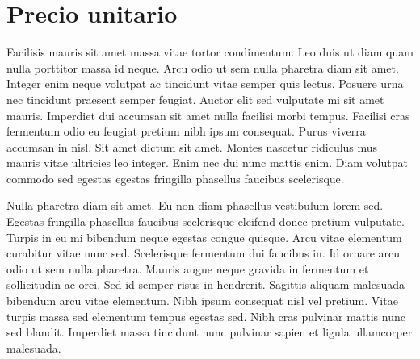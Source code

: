 \section{Precio unitario}

Facilisis mauris sit amet massa vitae tortor condimentum. Leo duis ut diam quam nulla porttitor massa id neque. Arcu odio ut sem nulla pharetra diam sit amet. Integer enim neque volutpat ac tincidunt vitae semper quis lectus. Posuere urna nec tincidunt praesent semper feugiat. Auctor elit sed vulputate mi sit amet mauris. Imperdiet dui accumsan sit amet nulla facilisi morbi tempus. Facilisi cras fermentum odio eu feugiat pretium nibh ipsum consequat. Purus viverra accumsan in nisl. Sit amet dictum sit amet. Montes nascetur ridiculus mus mauris vitae ultricies leo integer. Enim nec dui nunc mattis enim. Diam volutpat commodo sed egestas egestas fringilla phasellus faucibus scelerisque.

Nulla pharetra diam sit amet. Eu non diam phasellus vestibulum lorem sed. Egestas fringilla phasellus faucibus scelerisque eleifend donec pretium vulputate. Turpis in eu mi bibendum neque egestas congue quisque. Arcu vitae elementum curabitur vitae nunc sed. Scelerisque fermentum dui faucibus in. Id ornare arcu odio ut sem nulla pharetra. Mauris augue neque gravida in fermentum et sollicitudin ac orci. Sed id semper risus in hendrerit. Sagittis aliquam malesuada bibendum arcu vitae elementum. Nibh ipsum consequat nisl vel pretium. Vitae turpis massa sed elementum tempus egestas sed. Nibh cras pulvinar mattis nunc sed blandit. Imperdiet massa tincidunt nunc pulvinar sapien et ligula ullamcorper malesuada.




